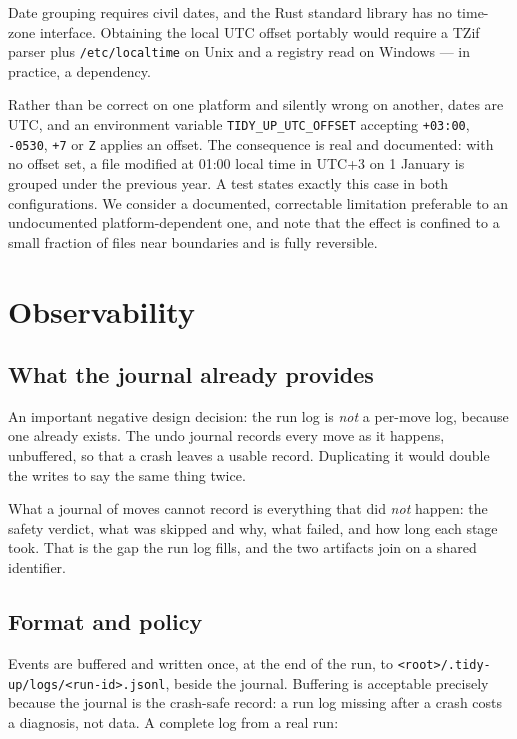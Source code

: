 \documentclass[11pt,a4paper]{article}
\newcommand{\code}[1]{\texttt{\small #1}}
\begin{document}
Date grouping requires civil dates, and the Rust standard library has no time-zone
interface. Obtaining the local UTC offset portably would require a TZif parser plus
\code{/etc/localtime} on Unix and a registry read on Windows --- in practice, a
dependency.

Rather than be correct on one platform and silently wrong on another, dates are UTC,
and an environment variable \code{TIDY\_UP\_UTC\_OFFSET} accepting \code{+03:00},
\code{-0530}, \code{+7} or \code{Z} applies an offset. The consequence is real and
documented: with no offset set, a file modified at 01:00 local time in UTC+3 on
1 January is grouped under the previous year. A test states exactly this case in both
configurations. We consider a documented, correctable limitation preferable to an
undocumented platform-dependent one, and note that the effect is confined to a small
fraction of files near boundaries and is fully reversible.

\section{Observability}
\label{sec:obs}

\subsection{What the journal already provides}

An important negative design decision: the run log is \emph{not} a per-move log,
because one already exists. The undo journal records every move as it happens,
unbuffered, so that a crash leaves a usable record. Duplicating it would double the
writes to say the same thing twice.

What a journal of moves cannot record is everything that did \emph{not} happen: the
safety verdict, what was skipped and why, what failed, and how long each stage took.
That is the gap the run log fills, and the two artifacts join on a shared identifier.

\subsection{Format and policy}

Events are buffered and written once, at the end of the run, to
\code{<root>/.tidy-up/logs/<run-id>.jsonl}, beside the journal. Buffering is
acceptable precisely because the journal is the crash-safe record: a run log missing
after a crash costs a diagnosis, not data. A complete log from a real run:
\end{document}
